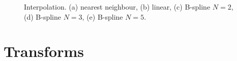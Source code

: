 \documentclass[]{report}
\begin{document}
\begin{figure}[tb]
\centering
{}\label{sfig:interpolation:nn}
\label{sfig:interpolation:lin}
\label{sfig:interpolation:bs2}
\label{sfig:interpolation:bs3}
\label{sfig:interpolation:bs5}
\caption{Interpolation. (a) nearest neighbour, (b) linear, (c)
B-spline $N=2$, (d) B-spline $N=3$, (e) B-spline $N=5$.}
\label{fig:interpolation}
\end{figure}

\section{Transforms}\label{sec:comp:transform}
\end{document}
